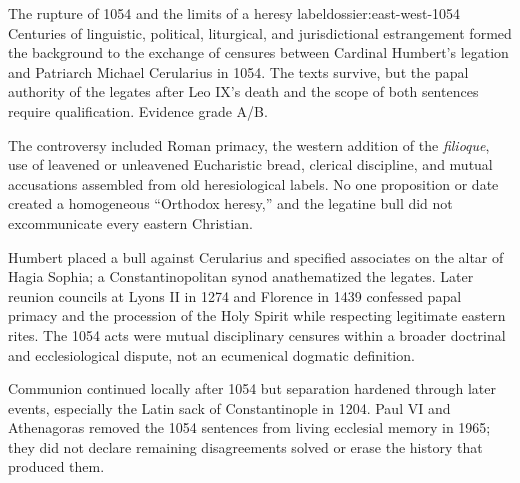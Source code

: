 \begin{heresydossier}{The rupture of 1054 and the limits of a heresy label}{dossier:east-west-1054}
\objectfield Centuries of linguistic, political, liturgical, and jurisdictional estrangement formed the background to the exchange of censures between Cardinal Humbert's legation and Patriarch Michael Cerularius in 1054. The texts survive, but the papal authority of the legates after Leo IX's death and the scope of both sentences require qualification. Evidence grade A/B.

\propositionfield The controversy included Roman primacy, the western addition of the \emph{filioque}, use of leavened or unleavened Eucharistic bread, clerical discipline, and mutual accusations assembled from old heresiological labels. No one proposition or date created a homogeneous ``Orthodox heresy,'' and the legatine bull did not excommunicate every eastern Christian.

\responsefield Humbert placed a bull against Cerularius and specified associates on the altar of Hagia Sophia; a Constantinopolitan synod anathematized the legates. Later reunion councils at Lyons II in 1274 and Florence in 1439 confessed papal primacy and the procession of the Holy Spirit while respecting legitimate eastern rites. The 1054 acts were mutual disciplinary censures within a broader doctrinal and ecclesiological dispute, not an ecumenical dogmatic definition.

\aftermathfield Communion continued locally after 1054 but separation hardened through later events, especially the Latin sack of Constantinople in 1204. Paul VI and Athenagoras removed the 1054 sentences from living ecclesial memory in 1965; they did not declare remaining disagreements solved or erase the history that produced them.
\end{heresydossier}

